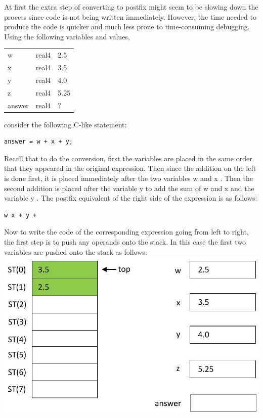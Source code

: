 \documentclass[10pt]{article}
\begin{document}
At first the extra step of converting to postfix might seem to be slowing down the process since code is not being written immediately. However, the time needed to produce the code is quicker and much less prone to time-consuming debugging. Using the following variables and values,

\begin{center}
\begin{tabular}{lll}
w & real4 & 2.5 \\
x & real4 & 3.5 \\
y & real4 & 4.0 \\
z & real4 & 5.25 \\
answer & real4 & $?$ \\
\end{tabular}
\end{center}

consider the following C-like statement:

\begin{verbatim}
answer = w + x + y;
\end{verbatim}

Recall that to do the conversion, first the variables are placed in the same order that they appeared in the original expression. Then since the addition on the left is done first, it is placed immediately after the two variables w and x . Then the second addition is placed after the variable y to add the sum of w and x and the variable y . The postfix equivalent of the right side of the expression is as follows:

\begin{verbatim}
w x + y +
\end{verbatim}

Now to write the code of the corresponding expression going from left to right, the first step is to push any operands onto the stack. In this case the first two variables are pushed onto the stack as follows:\\
\includegraphics[max width=\textwidth, center]{2025_03_24_ebe50cc223a6fbc49eecg-227(1)}
\end{document}
